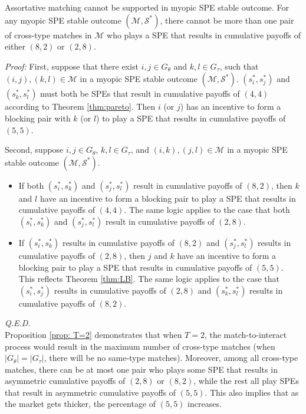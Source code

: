 \documentclass{myPaper}
\begin{document}
\begin{proposition} \label{prop: T=2}
Assortative matching cannot be supported in myopic SPE stable outcome. For any myopic SPE stable outcome $(\mathcal{M}, \mathcal{S}^*)$, there cannot be more than one pair of cross-type matches in $\mathcal{M}$ who plays a SPE that results in cumulative payoffs of either $(8, 2)$ or $(2, 8)$.  \end{proposition}
\noindent \textit{Proof:} First, suppose that there exist $i, j \in G_\theta$ and $k, l \in G_\tau$, such that $(i, j), (k, l) \in \mathcal{M}$ in a myopic SPE stable outcome $(\mathcal{M}, \mathcal{S}^*)$. $(s_i^*, s_j^*)$ and $(s_k^*, s_l^*)$ must both be SPEs that result in cumulative payoffs of $(4, 4)$ according to Theorem \ref{thm:pareto}. Then $i$ (or $j$) has an incentive to form a blocking pair with $k$ (or $l$) to play a SPE that results in  cumulative payoffs of $(5, 5)$.

Second, suppose $i, j \in G_\theta$, $k , l\in G_\tau$, and $(i, k), (j, l) \in \mathcal{M}$ in a myopic SPE stable outcome $(\mathcal{M}, \mathcal{S}^*)$. 
\begin{itemize}
\item[(i)] If both $(s_i^*, s_k^*)$ and $(s_j^*, s_l^*)$ result in cumulative payoffs of $(8, 2)$, then $k$ and $l$ have an incentive to form a blocking pair to play a SPE that results in  cumulative payoffs of $(4, 4)$. The same logic applies to the case that both $(s_i^*, s_k^*)$ and $(s_j^*, s_l^*)$ result in cumulative payoffs of $(2, 8)$.
\item[(ii)] If $(s_i^*, s_k^*)$ results in cumulative payoffs of $(8, 2)$ and $(s_j^*, s_l^*)$ results in cumulative payoffs of $(2, 8)$, then $j$ and $k$ have an incentive to form a blocking pair to play a SPE that results in  cumulative payoffs of $(5, 5)$. This reflects Theorem \ref{thm:LB}. The same logic applies to the case that $(s_i^*, s_j^*)$ results in cumulative payoffs of $(2, 8)$ and $(s_k^*, s_l^*)$ results in cumulative payoffs of $(8, 2)$.
\end{itemize}
\textit{Q.E.D.}
\\

Proposition \ref{prop: T=2} demonstrates that when $T=2$, the match-to-interact process would result in the maximum number of cross-type matches (when $|G_\theta|=|G_\tau|$, there will be no same-type matches). Moreover, among all cross-type matches, there can be at most one pair who plays some SPE that results in asymmetric cumulative payoffs of $(2, 8)$ or $(8, 2)$, while the rest all play SPEs that result in asymmetric cumulative payoffs of $(5, 5)$. This also implies that as the market gets thicker, the percentage of $(5, 5)$ increases. 
\end{document}
